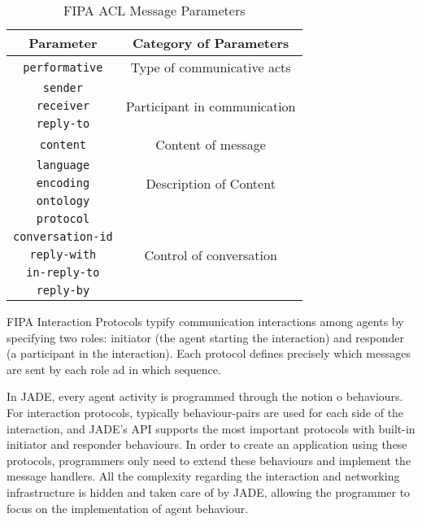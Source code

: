 \begin{table}[h]
	\normalsize
	\caption{FIPA ACL Message Parameters}
	\label{tab:fipaACLMessage}
	\begin{center}
		\begin{tabular}{c|c}
		\hline
		\textbf{Parameter} & \textbf{Category of Parameters} \\
		\hline
		\colorbox{Apricot}{\texttt{performative}} & Type of communicative acts \\
		\hline
		\colorbox{Apricot}{\texttt{sender}} & \multirow{3}{*}{Participant in communication} \\
		\cline{1-1}
		\colorbox{Apricot}{\texttt{receiver}} \\
		\cline{1-1}
		\texttt{reply-to}  \\
		\hline
		\colorbox{Apricot}{\texttt{content}} & Content of message \\
		\hline
		\texttt{language} & \multirow{3}{*}{Description of Content} \\
		\cline{1-1}
		\texttt{encoding} \\
		\cline{1-1}
		\colorbox{Apricot}{\texttt{ontology}} \\
		\hline
		\colorbox{Apricot}{\texttt{protocol}} & \multirow{5}{*}{Control of conversation} \\
		\cline{1-1}
		\colorbox{Apricot}{\texttt{conversation-id}} \\
		\cline{1-1}
		\texttt{reply-with} \\
		\cline{1-1}
		\texttt{in-reply-to} \\
		\cline{1-1}
		\colorbox{Apricot}{\texttt{reply-by}} \\
		\hline
		\end{tabular}
	\end{center}
\end{table} 

FIPA Interaction Protocols typify communication interactions among agents by specifying two roles: initiator (the agent starting the interaction) and responder (a participant in the interaction). Each protocol defines precisely which messages are sent by each role ad in which sequence.

In JADE, every agent activity is programmed through the notion o behaviours. For interaction protocols, typically behaviour-pairs are used for each side of the interaction, and JADE's API supports the most important protocols with built-in initiator and responder behaviours.
In order to create an application using these protocols, programmers only need to extend these behaviours and implement the message handlers.
All the complexity regarding the interaction and networking infrastructure is hidden and taken care of by JADE, allowing the programmer to focus on the implementation of agent behaviour.